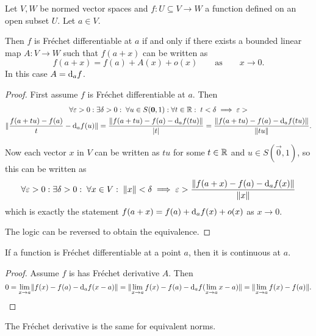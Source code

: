 \begin{proposition}
Let $V,W$ be normed vector spaces and $f:U\subseteq V\to W$ a function defined on an open subset $U$. Let $a\in V$.

Then $f$ is Fréchet differentiable at $a$ \textup{if and only if} there exists a bounded linear map $A: V\to W$ such that $f(a+x)$ can be written as
\[ f(a+x) = f(a) + A(x) + o(x) \qquad \text{as} \qquad x\to 0. \]
In this case $A = \operatorname{d \!}{_af}$.
\end{proposition}
\begin{proof}
First assume $f$ is Fréchet differentiable at $a$. Then
\begin{multline*}
\forall \varepsilon>0:\exists \delta>0: \; \forall u\in S(\boldsymbol{\mathrm{0}},1): \forall t\in\mathbb{R}: \; t< \delta \implies \varepsilon > \\ \lVert\frac{f(a+tu) - f(a)}{t} - \operatorname{d \!}{_af}(u)\rVert = \frac{\lVert f(a+tu) - f(a)- \operatorname{d \!}{_af}(tu)\rVert}{|t|} = \frac{\lVert f(a+tu) - f(a)- \operatorname{d \!}{_af}(tu)\rVert}{\lVert tu\rVert}.
\end{multline*}

Now each vector $x$ in $V$ can be written as $tu$ for some $t\in\mathbb{R}$ and $u\in S(\vec{0},1)$, so this can be written as
\[ \forall \varepsilon>0:\exists \delta>0: \; \forall x\in V: \; \lVert x\rVert< \delta \implies  \varepsilon > \frac{\lVert f(a+x) - f(a)- \operatorname{d \!}{_af}(x)\rVert}{\lVert x\rVert} \]
which is exactly the statement $f(a+x) = f(a) + \operatorname{d \!}{_af}(x) + o(x)$ as $x\to 0$.

The logic can be reversed to obtain the equivalence.
\end{proof}

\begin{proposition}
If a function is Fréchet differentiable at a point $a$, then it is continuous at $a$.
\end{proposition}
\begin{proof}
Assume $f$ is has Fréchet derivative $A$. Then
\[ 0 = \lim_{x\to a} \lVert f(x) - f(a) - \operatorname{d \!}{_af}(x-a)\rVert = \lVert\lim_{x\to a}f(x) - f(a) - \operatorname{d \!}{_af}(\lim_{x\to a} x-a)\rVert = \lVert\lim_{x\to a}f(x) - f(a)\rVert. \]
\end{proof}

\begin{lemma}
The Fréchet derivative is the same for equivalent norms.
\end{lemma}

